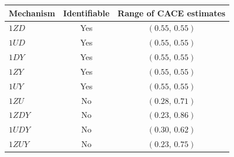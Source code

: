 \begin{tabular}{l c c}
\toprule
Mechanism & Identifiable & Range of CACE estimates \\
\midrule
$1\mathit{ZD}$ & Yes & $(0.55,\, 0.55)$ \\
$1\mathit{UD}$ & Yes & $(0.55,\, 0.55)$ \\
$1\mathit{DY}$ & Yes & $(0.55,\, 0.55)$ \\
$1\mathit{ZY}$ & Yes & $(0.55,\, 0.55)$ \\
$1\mathit{UY}$ & Yes & $(0.55,\, 0.55)$ \\
\midrule
$1\mathit{ZU}$ & No & $(0.28,\, 0.71)$ \\
$1\mathit{ZDY}$ & No & $(0.23,\, 0.86)$ \\
$1\mathit{UDY}$ & No & $(0.30,\, 0.62)$ \\
$1\mathit{ZUY}$ & No & $(0.23,\, 0.75)$ \\
\bottomrule
\end{tabular}
